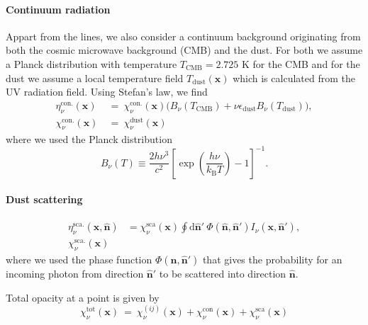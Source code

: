 \documentclass[]{article}
\newcommand{\kb}{k_{\text{B}}}
\newcommand{\D}{\text{d}}
\begin{document}
\paragraph{Continuum radiation} Appart from the lines, we also consider a continuum background originating from both the cosmic microwave background (CMB) and the dust. For both we assume a Planck distribution with temperature $T_{\text{CMB}} = 2.725$ K for the CMB and for the dust we assume a local temperature field $T_{\text{dust}}(\textbf{x})$ which is calculated from the UV radiation field. Using Stefan's law, we find
\begin{equation}
\begin{split}
\eta^{\text{con.}}_{\nu}(\textbf{x}) \ &= \ \chi^{\text{con.}}_{\nu}(\textbf{x}) \big( B_{\nu}(T_{\text{CMB}}) + \nu \epsilon_{\text{dust}} B_{\nu}(T_{\text{dust}}) \big), \\
\chi^{\text{con.}}_{\nu}(\textbf{x}) \ &= \ \chi^{\text{dust}}_{\nu}(\textbf{x})
\end{split}
\end{equation}
where we used the Planck distribution
\begin{equation}
B_{\nu}(T) \equiv \frac{2 h \nu^{3}}{c^{2}} \left[ \exp\left( \frac{h \nu}{ \kb T} \right)  -1 \right]^{-1}.
\end{equation}

\paragraph{Dust scattering}
\begin{equation}
\begin{split}
\eta^{\text{sca.}}_{\nu}(\textbf{x}, \hat{\textbf{n}}) &= \chi_{\nu}^{\text{sca}}(\textbf{x}) \oint \D \hat{\textbf{n}}' \ \Phi(\hat{\textbf{n}},\hat{\textbf{n}}') I_{\nu}(\textbf{x},\hat{\textbf{n}}'), \\
\chi^{\text{sca.}}_{\nu}(\textbf{x})
\end{split}
\end{equation}
where we used the phase function  $\Phi(\hat{\textbf{n}},\hat{\textbf{n}}')$ that gives the probability for an incoming photon from direction $\hat{\textbf{n}}'$ to be scattered into direction $\hat{\textbf{n}}$.

\bigskip

Total opacity at a point is given by
\begin{equation}
\chi^{\text{tot}}_{\nu}(\textbf{x}) \ = \  \chi^{(ij)}_{\nu}(\textbf{x}) + \chi^{\text{con}}_{\nu}(\textbf{x}) + \chi^{\text{sca}}_{\nu}(\textbf{x})
\end{equation}
\end{document}
